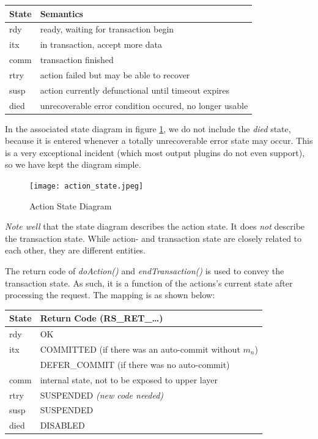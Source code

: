 \documentclass[a4paper,10pt]{article}
\begin{document}
\begin{center}
\begin{tabular}{|l|l|} \hline
	State		& Semantics \\\hline
	rdy 		& ready, waiting for transaction begin\\
	itx		& in transaction, accept more data \\
	comm		& transaction finished \\
	rtry		& action failed but may be able to recover \\
	susp		& action currently defunctional until timeout expires \\
	died		& unrecoverable error condition occured, no longer usable \\\hline
\end{tabular}
\end{center}

In the associated state diagram in figure \ref{fig_action_states}, we do not include the \emph{died} state, because it is entered whenever a totally unrecoverable error state may occur. This is a very exceptional incident (which most output plugins do not even support), so we have kept the diagram simple.

\begin{figure}
\begin{center}
\texttt{[image: action\_state.jpeg]}
\end{center}
\caption{Action State Diagram}
\label{fig_action_states}
\end{figure}

\emph{Note well} that the state diagram describes the action state. It does \emph{not} describe the transaction state. While action- and transaction state are closely related to each other, they are different entities.

The return code of \emph{doAction()} and \emph{endTransaction()} is used to convey the transaction state. As such, it is a function of the actions's current state after processing the request. The mapping is as shown below:

\begin{center}
\begin{tabular}{|l|l|} \hline
	State		& Return Code (RS\_RET\_\ldots)\\\hline
	rdy 		& OK \\
	itx		& COMMITTED (if there was an auto-commit without $m_n$)\\
			& DEFER\_COMMIT (if there was no auto-commit)\\
	comm		& internal state, not to be exposed to upper layer \\
	rtry		& SUSPENDED \emph{(new code needed)} \\
	susp		& SUSPENDED \\
	died		& DISABLED \\\hline
\end{tabular}
\end{center}
\end{document}
